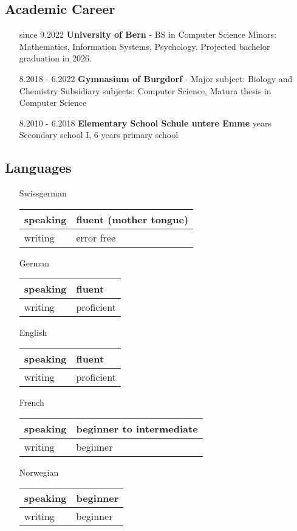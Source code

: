 \documentclass{article}
\begin{document}
\subsection{Academic Career}
\begin{itemize}[leftmargin=3cm, labelsep = 0.5cm ]
    \item[since 9.2022] \textbf{University of Bern} - BS in Computer Science \newline
    Minors: Mathematics, Information Systems, Psychology. Projected bachelor graduation in 2026.  \\
    \item[8.2018 - 6.2022] \textbf{Gymnasium of Burgdorf} - Major subject: Biology and Chemistry  \newline
     Subsidiary subjects: Computer Science, Matura thesis in Computer Science\\
    \item[8.2010 - 6.2018] \textbf{Elementary School Schule untere Emme}  years Secondary school I, 6 years primary school 
\end{itemize}
\subsection{Languages}
\begin{itemize}[leftmargin=3cm, labelsep = 0.5cm ]
    \item[Swissgerman]
    \begin{tabular}{| m{4em} | m{12em}}
        speaking& fluent (mother tongue)\\
        \hline
        writing  & error free\\
      \end{tabular}\newline
    \item[German]
    \begin{tabular}{| m{4em} | m{12em}}
        speaking & fluent\\
        \hline
        writing & proficient\\
    \end{tabular}
    \item[English]
    \begin{tabular}{| m{4em} | m{12em}}
        speaking & fluent\\
        \hline
        writing & proficient\\
    \end{tabular}
    \item[French]
    \begin{tabular}{| m{4em} | m{12em}}
        speaking & beginner to intermediate\\
        \hline
        writing & beginner\\
    \end{tabular}
    \item[Norwegian]
    \begin{tabular}{| m{4em} | m{12em}}
        speaking & beginner\\
        \hline
        writing & beginner\\
    \end{tabular}
\end{itemize}
\end{document}
